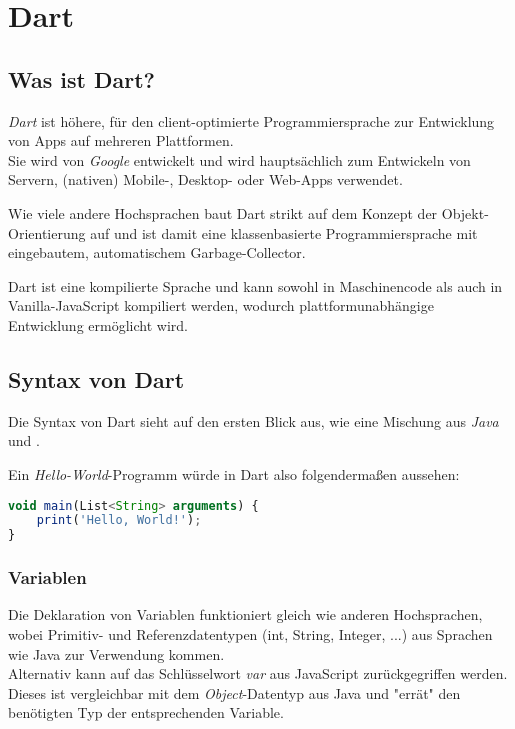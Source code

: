 \section{Dart}

\subsection{Was ist Dart?}

\textit{Dart} ist höhere, für den client-optimierte Programmiersprache
zur Entwicklung von Apps auf mehreren Plattformen.\\
Sie wird von \textit{Google} entwickelt und wird hauptsächlich zum Entwickeln von
Servern, (nativen) Mobile-, Desktop- oder Web-Apps verwendet.

Wie viele andere Hochsprachen baut Dart strikt auf dem Konzept der Objekt-Orientierung auf
und ist damit eine klassenbasierte Programmiersprache mit eingebautem, automatischem
Garbage-Collector.

Dart ist eine kompilierte Sprache und kann sowohl in Maschinencode als auch in \\
Vanilla-JavaScript kompiliert werden, wodurch plattformunabhängige Entwicklung ermöglicht 
wird.

\subsection{Syntax von Dart}

Die Syntax von Dart sieht auf den ersten Blick aus, wie eine Mischung aus \textit{Java}\\
und .

Ein \textit{Hello-World}-Programm würde in Dart also folgendermaßen aussehen:
\begin{lstlisting}[language=JavaScript]
void main(List<String> arguments) {
    print('Hello, World!');
}
\end{lstlisting}

\subsubsection{Variablen}

Die Deklaration von Variablen funktioniert gleich wie anderen Hochsprachen,
wobei Primitiv- und Referenzdatentypen (int, String, Integer, ...) aus Sprachen wie Java zur Verwendung
kommen.\\
Alternativ kann auf das Schlüsselwort \textit{var} aus JavaScript zurückgegriffen werden. Dieses
ist vergleichbar mit dem \textit{Object}-Datentyp aus Java und "errät" den benötigten
Typ der entsprechenden Variable.

